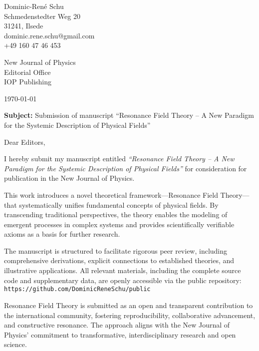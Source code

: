 \documentclass[a4paper,12pt]{article}
\begin{document}
	
	\vspace*{-2cm}
	
	Dominic-René Schu\\
	Schmedenstedter Weg 20\\
	31241, Ilsede\\
	dominic.rene.schu@gmail.com\\
	+49 160 47 46 453\\
	
	\vspace{1cm}
	
	New Journal of Physics\\
	Editorial Office\\
	IOP Publishing
	
	\vspace{1cm}
	
	\today
	
	\vspace{1cm}
	
	\textbf{Subject:} Submission of manuscript ``Resonance Field Theory – A New Paradigm for the Systemic Description of Physical Fields''
	
	\vspace{1cm}
	
	Dear Editors,
	
	\vspace{0.5cm}
	
	I hereby submit my manuscript entitled \textit{``Resonance Field Theory – A New Paradigm for the Systemic Description of Physical Fields''} for consideration for publication in the New Journal of Physics.
	
	This work introduces a novel theoretical framework—Resonance Field Theory—that systematically unifies fundamental concepts of physical fields. By transcending traditional perspectives, the theory enables the modeling of emergent processes in complex systems and provides scientifically verifiable axioms as a basis for further research.
	
	The manuscript is structured to facilitate rigorous peer review, including comprehensive derivations, explicit connections to established theories, and illustrative applications. All relevant materials, including the complete source code and supplementary data, are openly accessible via the public repository: \\
	\texttt{https://github.com/DominicReneSchu/public}
	
	Resonance Field Theory is submitted as an open and transparent contribution to the international community, fostering reproducibility, collaborative advancement, and constructive resonance. The approach aligns with the New Journal of Physics’ commitment to transformative, interdisciplinary research and open science.
	
\end{document}
